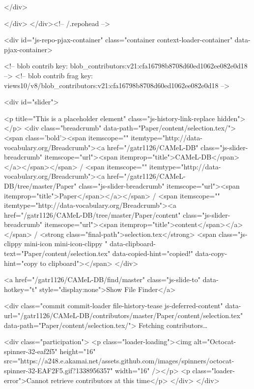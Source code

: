 </div>

  
  
  


            
          </div>
        </div><!-- /.repohead -->

        <div id="js-repo-pjax-container" class="container context-loader-container" data-pjax-container>
          


<!-- blob contrib key: blob_contributors:v21:cfa16798b8708d60ed1062ee082e0d18 -->
<!-- blob contrib frag key: views10/v8/blob_contributors:v21:cfa16798b8708d60ed1062ee082e0d18 -->

<div id="slider">


    <p title="This is a placeholder element" class="js-history-link-replace hidden"></p>
    <div class="breadcrumb" data-path="Paper/content/selection.tex/">
      <span class='bold'><span itemscope="" itemtype="http://data-vocabulary.org/Breadcrumb"><a href="/gatr1126/CAMeL-DB" class="js-slider-breadcrumb" itemscope="url"><span itemprop="title">CAMeL-DB</span></a></span></span> / <span itemscope="" itemtype="http://data-vocabulary.org/Breadcrumb"><a href="/gatr1126/CAMeL-DB/tree/master/Paper" class="js-slider-breadcrumb" itemscope="url"><span itemprop="title">Paper</span></a></span> / <span itemscope="" itemtype="http://data-vocabulary.org/Breadcrumb"><a href="/gatr1126/CAMeL-DB/tree/master/Paper/content" class="js-slider-breadcrumb" itemscope="url"><span itemprop="title">content</span></a></span> / <strong class="final-path">selection.tex</strong> <span class="js-clippy mini-icon mini-icon-clippy " data-clipboard-text="Paper/content/selection.tex" data-copied-hint="copied!" data-copy-hint="copy to clipboard"></span>
    </div>

    <a href="/gatr1126/CAMeL-DB/find/master" class="js-slide-to" data-hotkey="t" style="display:none">Show File Finder</a>

      <div class="commit commit-loader file-history-tease js-deferred-content" data-url="/gatr1126/CAMeL-DB/contributors/master/Paper/content/selection.tex" data-path="Paper/content/selection.tex/">
        Fetching contributors…

        <div class="participation">
          <p class="loader-loading"><img alt="Octocat-spinner-32-eaf2f5" height="16" src="https://a248.e.akamai.net/assets.github.com/images/spinners/octocat-spinner-32-EAF2F5.gif?1338956357" width="16" /></p>
          <p class="loader-error">Cannot retrieve contributors at this time</p>
        </div>
      </div>

